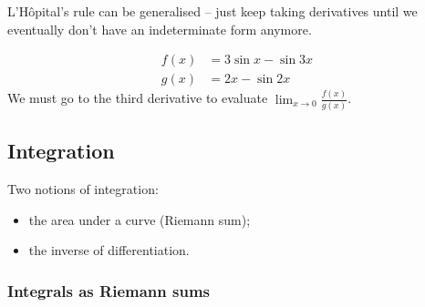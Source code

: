 \documentclass{../../template/note}
\begin{document}

    L'H\^opital's rule can be generalised -- just keep taking derivatives until we eventually don't have an indeterminate form anymore.

    \begin{example}
        \begin{align*}
            f(x) &= 3 \sin x - \sin 3x \\
            g(x) &= 2x - \sin 2x
        \end{align*}
        We must go to the third derivative to evaluate \(\lim_{x \to 0}\frac{f(x)}{g(x)}\).        
    \end{example}
    
    \subsection{Integration}

    Two notions of integration:

    \begin{itemize}
        \item the area under a curve (Riemann sum);
        \item the inverse of differentiation.
    \end{itemize}
    
    \subsubsection{Integrals as Riemann sums}
\end{document}
